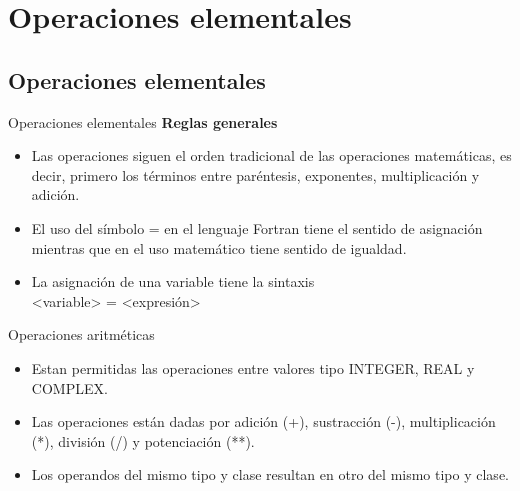 
\section{Operaciones elementales}  


\subsection{Operaciones elementales}

\begin{frame}[fragile]{Operaciones elementales} 
\textbf{Reglas generales}
 \begin{itemize}[<+(1)->]
  \item Las operaciones siguen el orden tradicional de las operaciones matemáticas, es decir, primero los términos entre paréntesis, exponentes, multiplicación y adición.
  \item El uso del símbolo = en el lenguaje Fortran tiene el sentido de asignación mientras que en el uso matemático tiene sentido de igualdad. 
  \item La asignación de una variable tiene la sintaxis \\
      \centering <variable> = <expresión>\\
 \end{itemize}
\end{frame}

\begin{frame}[fragile]{Operaciones aritméticas}
 \begin{itemize}[<+(0)->]
  \item Estan permitidas las operaciones entre valores tipo INTEGER, REAL y COMPLEX.
  \item Las operaciones están dadas por adición (+), sustracción (-), multiplicación (*), división (/) y potenciación (**).
  \item Los operandos del mismo tipo y clase resultan en otro del mismo tipo y clase.
 \end{itemize}
\end{frame}

